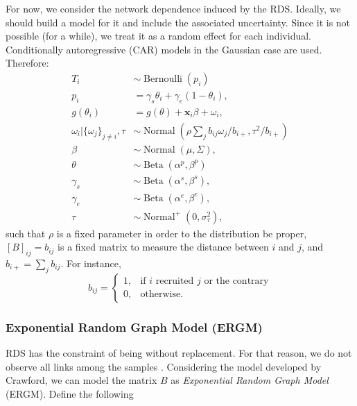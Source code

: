 \documentclass[a4paper, notitlepage, 11pt]{article}
\newcommand{\x}{\boldsymbol{x}}
\newcommand{\N}{\operatorname{Normal}}
\newcommand{\betadist}{\operatorname{Beta}}
\theoremstyle{definition}
\theoremstyle{remark}
\begin{document}
For now, we consider the network dependence induced by the RDS. Ideally, we 
should build a model for it and include the associated uncertainty.
Since it is not possible (for a while), we treat it as a random effect for
each individual. Conditionally autoregressive (CAR) models in the
Gaussian case are used. Therefore: 
\begin{equation}
  \begin{aligned}
    T_i &\sim \operatorname{Bernoulli}(p_i) \\
    p_i &= \gamma_s\theta_i + \gamma_e(1 - \theta_i),  \\
    g(\theta_i) &= g(\theta) + \x_i\beta + \omega_i,  \\
    \omega_i|\{\omega_j\}_{j\neq i}, \tau &\sim \N\left(\rho\sum_j b_{ij}\omega_j/b_{i+}, \tau^2/b_{i+}\right) \\
    \beta &\sim \N(\mu, \Sigma), \\ 
    \theta &\sim \betadist(\alpha^p, \beta^p) \\
    \gamma_s &\sim \betadist(\alpha^s, \beta^s), \\
    \gamma_e &\sim \betadist(\alpha^e, \beta^e), \\  
    \tau &\sim \N^+(0,\sigma^2_{\tau}),  
  \end{aligned}  
\end{equation}
such that $\rho$ is a fixed parameter in order to the distribution be proper, $[B]_{ij} = b_{ij}$ is a fixed matrix to measure the distance between $i$
and $j$, and $b_{i+} = \sum_{j} b_{ij}$. For instance, 
$$
b_{ij} = \begin{cases}
  1, &\text{if } i \text{ recruited } j \text{ or the contrary} \\
  0, &\text{otherwise.} 
\end{cases}
$$

\subsubsection{Exponential Random Graph Model (ERGM)}

RDS has the constraint of being without replacement. For that reason, we do
not observe all links among the samples \cite{crawford2016}. Considering the
model developed by Crawford, we can model the
matrix $B$ as {\em Exponential Random Graph Model} (ERGM). Define the following
\end{document}
